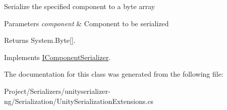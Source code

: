 Serialize the specified component to a byte array 


\begin{DoxyParams}{Parameters}
{\em component} & Component to be serialized\\
\hline
\end{DoxyParams}
\begin{DoxyReturn}{Returns}
System.\+Byte\mbox{[}\mbox{]}.
\end{DoxyReturn}


Implements \hyperlink{interface_i_component_serializer_ab2aa38005665496b62d6c54b5f0dbd31}{I\+Component\+Serializer}.



The documentation for this class was generated from the following file\+:\begin{DoxyCompactItemize}
\item 
Project/\+Serializers/unityserializer-\/ng/\+Serialization/Unity\+Serialization\+Extensions.\+cs\end{DoxyCompactItemize}
